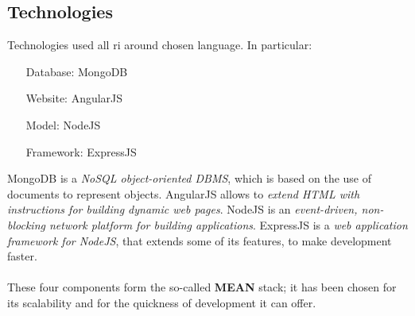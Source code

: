 \newpage

\subsection{Technologies}
Technologies used all ri around chosen language. In particular:
\begin{itemize}
  \item[Database:] MongoDB
  \item[Website:] AngularJS
  \item[Model:] NodeJS
  \item[Framework:] ExpressJS
\end{itemize}
MongoDB is a \emph{NoSQL object-oriented DBMS}, which is based on the use of documents to represent objects. AngularJS allows to \emph{extend HTML with instructions for building dynamic web pages}. NodeJS is an \emph{event-driven, non-blocking network platform for building applications}. ExpressJS is a \emph{web application framework for NodeJS}, that extends some of its features, to make development faster.
\\
\\These four components form the so-called \textbf{MEAN} stack; it has been chosen for its scalability and for the quickness of development it can offer.